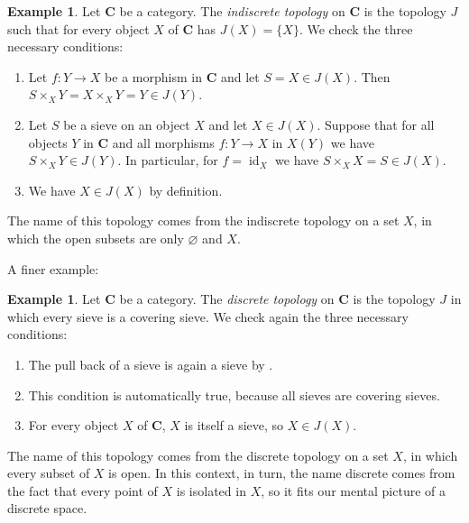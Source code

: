 \documentclass[12pt,reqno,a4paper]{amsart}
\theoremstyle{plain}
\theoremstyle{definition}
\newtheorem{exmp}[thm]{Example}
\theoremstyle{remark}
\begin{document}
\begin{exmp}\label{exmp:indiscrete}
  Let $\mathbf{C}$ be a category.
  The \textit{indiscrete topology} on $\mathbf{C}$ is the topology $J$ such that for every object $X$ of $\mathbf{C}$ has $J(X) = \{ X \}$.
  We check the three necessary conditions:
  \begin{enumerate}[label=(T\arabic*)]
    \item Let $f \colon Y \to X$ be a morphism in $\mathbf{C}$ and let $S = X \in J(X)$.
      Then $S \times_{X} Y = X \times_{X} Y = Y \in J(Y)$.
    \item Let $S$ be a sieve on an object $X$ and let $X \in J(X)$.
      Suppose that for all objects $Y$ in $\mathbf{C}$ and all morphisms $f \colon Y \to X$ in $X(Y)$ we have $S \times_{X} Y \in J(Y)$.
      In particular, for $f = \operatorname{id}_{X}$ we have $S \times_{X} X = S \in J(X)$.
    \item We have $X \in J(X)$ by definition.
  \end{enumerate}

  The name of this topology comes from the indiscrete topology on a set $X$, in which the open subsets are only $\varnothing$ and $X$.
\end{exmp}

A finer example:

\begin{exmp}\label{exmp:discretetopology}
  Let $\mathbf{C}$ be a category.
  The \textit{discrete topology} on $\mathbf{C}$ is the topology $J$ in which every sieve is a covering sieve.
  We check again the three necessary conditions:
  \begin{enumerate}[label=(T\arabic*)]
    \item The pull back of a sieve is again a sieve by .
    \item This condition is automatically true, because all sieves are covering sieves.
    \item For every object $X$ of $\mathbf{C}$, $X$ is itself a sieve, so $X \in J(X)$.
  \end{enumerate}

  The name of this topology comes from the discrete topology on a set $X$, in which every subset of $X$ is open.
  In this context, in turn, the name discrete comes from the fact that every point of $X$ is isolated in $X$, so it fits our mental picture of a discrete space.
\end{exmp}
\end{document}
